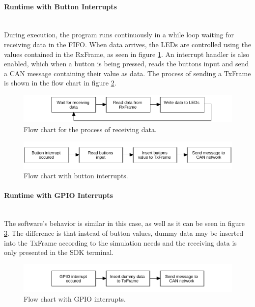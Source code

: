 \paragraph*{Runtime with Button Interrupts}~\\
During execution, the program runs continuously in a while loop waiting for receiving data in the FIFO.
When data arrives, the LEDs are controlled using the values contained in the RxFrame, as seen in figure \ref{fig:FlowChart_CANSoft_RecvData}.
An interrupt handler is also enabled, which when a button is being pressed, reads the buttons input and send a CAN message containing their value as data. The process of sending a TxFrame is shown in the flow chart in figure \ref{fig:FlowChart_CANSoft_BtnsIntr}.

\begin{figure}[h!]
	\centering
	\includegraphics[width = 1\linewidth]{graphics/FlowChart_CANSoft_RecvData.pdf}
	\caption{Flow chart for the process of receiving data.}
	\label{fig:FlowChart_CANSoft_RecvData}
\end{figure}


\begin{figure}[h!]
	\centering
	\includegraphics[width = 1\linewidth]{graphics/FlowChart_CANSoft_BtnsIntr.pdf}
	\caption{Flow chart with button interrupts.}
	\label{fig:FlowChart_CANSoft_BtnsIntr}
\end{figure}

\paragraph*{Runtime with GPIO Interrupts}~\\
The software's behavior is similar in this case, as well as it can be seen in figure \ref{fig:FlowChart_CANSoft_GPIOIntr}.
The difference is that instead of button values, dummy data may be inserted into the TxFrame according to the simulation needs and the receiving data is only presented in the SDK terminal.
\begin{figure}[h!]
	\centering
	\includegraphics[width = 1\linewidth]{graphics/FlowChart_CANSoft_GPIOIntr.pdf}
	\caption{Flow chart with GPIO interrupts.}
	\label{fig:FlowChart_CANSoft_GPIOIntr}
\end{figure}

